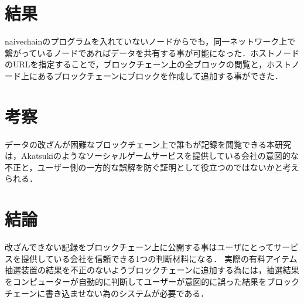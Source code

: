\documentclass[uplatex,twocolumn,dvipdfmx]{jsarticle}
\begin{document}
\section{結果}
naivechainのプログラムを入れていないノードからでも，同一ネットワーク上で繋がっているノードであればデータを共有する事が可能になった．ホストノードのURLを指定することで，ブロックチェーン上の全ブロックの閲覧と，ホストノード上にあるブロックチェーンにブロックを作成して追加する事ができた．

\section{考察}

データの改ざんが困難なブロックチェーン上で誰もが記録を閲覧できる本研究は，Akatsukiのようなソーシャルゲームサービスを提供している会社の意図的な不正と，ユーザー側の一方的な誤解を防ぐ証明として役立つのではないかと考えられる．

\section{結論}
改ざんできない記録をブロックチェーン上に公開する事はユーザにとってサービスを提供している会社を信頼できる1つの判断材料になる．
実際の有料アイテム抽選装置の結果を不正のないようブロックチェーンに追加する為には，抽選結果をコンピューターが自動的に判断してユーザーが意図的に誤った結果をブロックチェーンに書き込ませない為のシステムが必要である．





\end{document}
